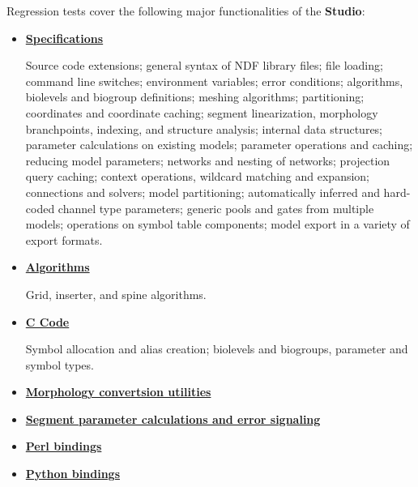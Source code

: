 \documentclass[12pt]{article}
\begin{document}
Regression tests cover the following major functionalities of the {\bf Studio}:
\begin{itemize}

\item[]\href{http://neurospaces.sourceforge.net/neurospaces_project/neurospaces/tests/html/specifications/main.html}{\bf Specifications}

Source code extensions; general syntax of NDF library files; file loading; command line switches; environment variables; error conditions;  algorithms, biolevels and biogroup definitions; meshing algorithms; partitioning; coordinates and coordinate caching;  segment linearization, morphology branchpoints, indexing, and structure analysis; internal data structures; parameter calculations on existing models; parameter operations and caching; reducing model parameters; networks and nesting of networks; projection query caching; context operations, wildcard matching and expansion; connections and solvers; model partitioning; automatically inferred and hard-coded channel type parameters;  generic pools and gates from multiple models; operations on symbol table components; model export in a variety of export formats.

\item[]\href{http://neurospaces.sourceforge.net/neurospaces_project/neurospaces/tests/html/specifications/algorithms/main.html}{\bf Algorithms}

Grid, inserter, and spine algorithms.

\item[]\href{http://neurospaces.sourceforge.net/neurospaces_project/neurospaces/tests/html/specifications/code/main.html}{\bf C Code}

Symbol allocation and alias creation; biolevels and biogroups, parameter and symbol types. 

\item[]\href{http://neurospaces.sourceforge.net/neurospaces_project/neurospaces/tests/html/specifications/convertors/main.html}{\bf Morphology convertsion utilities}

\item[]\href{http://neurospaces.sourceforge.net/neurospaces_project/neurospaces/tests/html/specifications/parameters/main.html}{\bf Segment parameter calculations and error signaling}

\item[]\href{http://neurospaces.sourceforge.net/neurospaces_project/neurospaces/tests/html/specifications/perl/main.html}{\bf Perl bindings}

\item[]\href{http://neurospaces.sourceforge.net/neurospaces_project/neurospaces/tests/html/specifications/python/main.html}{\bf Python bindings}

\end{itemize}
\end{document}
